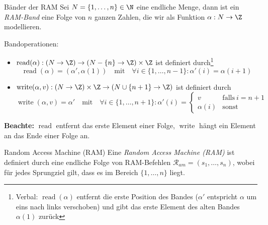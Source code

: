 \documentclass[german]{spicker}
\begin{document}
\begin{defi}{Bänder der RAM}
  Sei $N = \{1, \ldots, n\} \in \N$ eine endliche Menge, dann ist ein \emph{RAM-Band} eine Folge von $n$ ganzen Zahlen, die wir als Funktion $\alpha: N \to \Z$ modellieren.

  Bandoperationen:
  \begin{itemize}
    \item $\operatorname{read}(\alpha): (N \to \Z) \to (N - \{n\} \to \Z) \times \Z$ ist definiert durch\footnote{Verbal: $\operatorname{read}(\alpha)$ entfernt die erste Position des Bandes ($\alpha'$ entspricht $\alpha$ \glqq um eins nach links verschoben\grqq) und gibt das erste Element des alten Bandes $\alpha(1)$ zurück}
          $$
            \boxed{
              \operatorname{read}(\alpha) = (\alpha', \alpha(1))
            }
            \quad \text{mit} \quad \forall i \in \{1, \ldots, n-1\} : \alpha'(i) = \alpha(i+1)
          $$
    \item $\operatorname{write}(\alpha, v): (N \to \Z) \times \Z \to (N \cup \{n+1\} \to \Z)$ ist definiert durch
          $$
            \boxed{
              \operatorname{write}(\alpha, v) = \alpha'
            }
            \quad \text{mit} \quad \forall i \in \{1, \ldots, n+1\} : \alpha'(i) = \begin{cases}
              v         & \text{falls} \ i = n+1 \\
              \alpha(i) & \text{sonst}
            \end{cases}
          $$
  \end{itemize}

  \textbf{Beachte:}
  $\operatorname{read}$ entfernt das erste Element einer Folge, $\operatorname{write}$ hängt ein Element an das Ende einer Folge an.
\end{defi}

\begin{defi}{Random Access Machine (RAM)}
  Eine \emph{Random Access Machine (RAM)} ist definiert durch eine endliche Folge von RAM-Befehlen $\mathcal{R}_{am} = (s_1, \ldots, s_n)$, wobei für jedes Sprungziel gilt, dass es im Bereich $\{1, \ldots, n\}$ liegt.
\end{defi}
\end{document}
